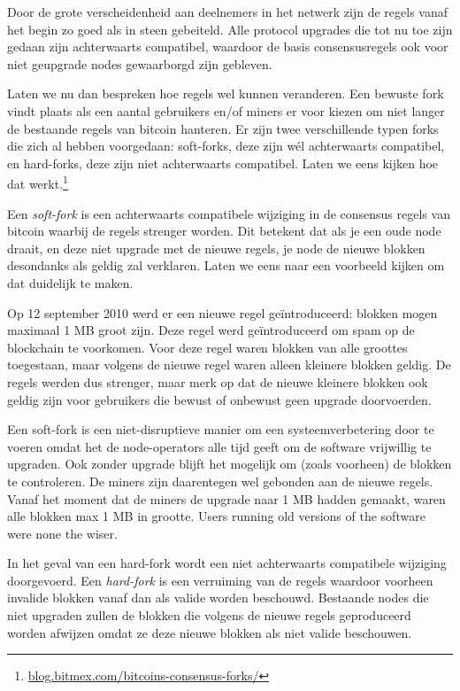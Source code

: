 \documentclass[smalldemyvopaper,11pt,twoside,onecolumn,openright,extrafontsizes]{memoir}
\begin{document}
Door de grote verscheidenheid aan deelnemers in het netwerk zijn de regels vanaf het begin zo goed als in steen gebeiteld. Alle protocol upgrades die tot nu toe zijn gedaan zijn achterwaarts compatibel, waardoor de basis consensusregels ook voor niet geupgrade nodes gewaarborgd zijn gebleven. 

Laten we nu dan bespreken hoe regels wel kunnen veranderen. Een bewuste fork vindt plaats als een aantal gebruikers en/of miners er voor kiezen om niet langer de bestaande regels van bitcoin hanteren. Er zijn twee verschillende typen forks die zich al hebben voorgedaan: soft-forks, deze zijn wél achterwaarts compatibel, en hard-forks, deze zijn niet achterwaarts compatibel. Laten we eens kijken hoe dat werkt.\footnote{\href{https://blog.bitmex.com/bitcoins-consensus-forks/}{blog.bitmex.com/bitcoins-consensus-forks/}}  


Een \textit{soft-fork} is een achterwaarts compatibele wijziging in de consensus regels van bitcoin waarbij de regels strenger worden. Dit betekent dat als je een oude node draait, en deze niet upgrade met de nieuwe regels, je node de nieuwe blokken desondanks als geldig zal verklaren. Laten we eens naar een voorbeeld kijken om dat duidelijk te maken.

Op 12 september 2010 werd er een nieuwe regel geïntroduceerd: blokken mogen maximaal 1 MB groot zijn. Deze regel werd geïntroduceerd om spam op de blockchain te voorkomen. Voor deze regel waren blokken van alle groottes toegestaan, maar volgens de nieuwe regel waren alleen kleinere blokken geldig. De regels werden dus strenger, maar merk op dat de nieuwe kleinere blokken ook geldig zijn voor gebruikers die bewust of onbewust geen upgrade doorvoerden. 

Een soft-fork is een niet-disruptieve manier om een systeemverbetering door te voeren omdat het de node-operators alle tijd geeft om de software vrijwillig te upgraden. Ook zonder upgrade blijft het mogelijk om (zoals voorheen) de blokken te controleren. De miners zijn daarentegen wel gebonden aan de nieuwe regels. Vanaf het moment dat de miners de upgrade naar 1 MB hadden gemaakt, waren alle blokken max 1 MB in grootte. Users running old versions of the software
were none the wiser. 

In het geval van een hard-fork wordt een niet achterwaarts compatibele wijziging doorgevoerd. Een \textit{hard-fork} is een verruiming van de regels waardoor voorheen invalide blokken vanaf dan als valide worden beschouwd. Bestaande nodes die niet upgraden zullen de blokken die volgens de nieuwe regels geproduceerd worden afwijzen omdat ze deze nieuwe blokken als niet valide beschouwen. 
\end{document}
